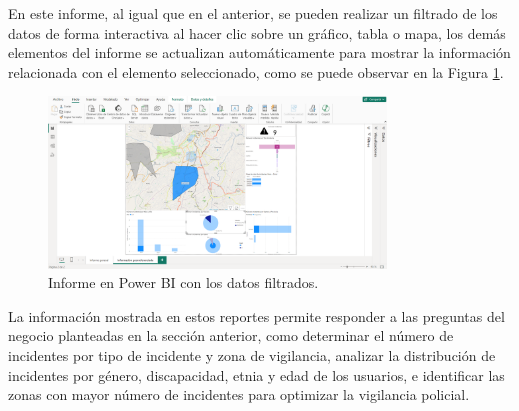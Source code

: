 En este informe, al igual que en el anterior, se pueden realizar un filtrado de los datos de forma interactiva al hacer clic sobre un gráfico,
tabla o mapa, los demás elementos del informe se actualizan automáticamente para mostrar la información relacionada con el elemento seleccionado,
como se puede observar en la Figura \ref{fig:informe-bi-geo-filtro}.

\begin{figure}[H]
    \centering
    \includegraphics[width=0.8\textwidth]{chapters/III-resultados-y-discusion/resources/images/informe-bi-geo-filtro.png}
    \caption{Informe en Power BI con los datos filtrados.}
    \label{fig:informe-bi-geo-filtro}
\end{figure}

La información mostrada en estos reportes permite responder a las preguntas del negocio planteadas en la sección anterior, como determinar
el número de incidentes por tipo de incidente y zona de vigilancia, analizar la distribución de incidentes por género, discapacidad, etnia
y edad de los usuarios, e identificar las zonas con mayor número de incidentes para optimizar la vigilancia policial.




